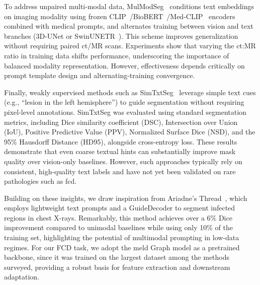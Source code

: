 \documentclass[FCD_GNN.tex]{subfiles}
\begin{document}
To address unpaired multi-modal data, MulModSeg~\cite{Li2025Mulmodseg} conditions text embeddings on imaging modality using frozen CLIP~\cite{Radford2021CLIP}/BioBERT~\cite{Lee2019BioBERT}/Med-CLIP~\cite{Wang2022MedCLIP} encoders 
combined with medical prompts, and alternates training between vision and text branches (3D-UNet\cite{Cicek2016UNet3D} or SwinUNETR~\cite{Hatamizadeh2022SwinUNETR}). This scheme improves generalization 
without requiring paired \ac{ct}/MR scans. Experiments show that varying the \ac{ct}:MR ratio in training data shifts performance, underscoring the importance 
of balanced modality representation. However, effectiveness depends critically on prompt template design and alternating-training convergence.


Finally, weakly supervised methods such as SimTxtSeg~\cite{Xie2024SimTxtSeg} leverage simple text cues 
(e.g., ``lesion in the left hemisphere'') to guide segmentation without requiring pixel-level annotations. 
SimTxtSeg was evaluated using standard segmentation metrics, including Dice similarity coefficient (DSC), 
Intersection over Union (IoU), Positive Predictive Value (PPV), Normalized Surface Dice (NSD), and the 
95\% Hausdorff Distance (HD95), alongside cross-entropy loss. These results demonstrate that even coarse 
textual hints can substantially improve mask quality over vision-only baselines. However, such approaches 
typically rely on consistent, high-quality text labels and have not yet been validated on rare pathologies 
such as \ac{fcd}.

Building on these insights, we draw inspiration from Ariadne’s Thread~\cite{Zhong2023Ariadne}, which employs 
lightweight text prompts and a GuideDecoder to segment infected regions in chest X-rays. Remarkably, this method 
achieves over a 6\% Dice improvement compared to unimodal baselines while using only 10\% of the training set, 
highlighting the potential of multimodal prompting in low-data regimes. For our FCD task, we adopt the \ac{meld} 
Graph model as a pretrained backbone, since it was trained on the largest dataset among the methods surveyed, 
providing a robust basis for feature extraction and downstream adaptation.
\end{document}
